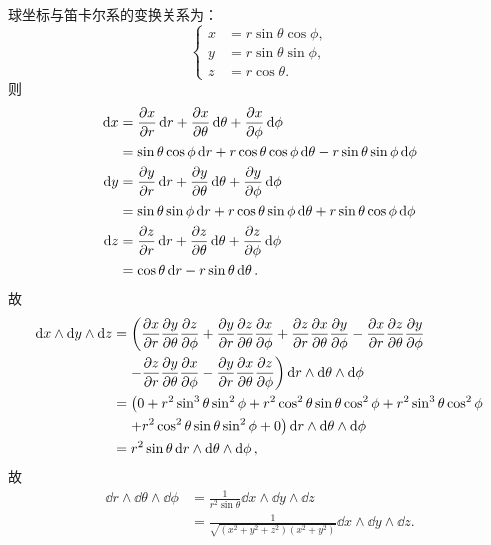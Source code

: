 \begin{xiti}
	\begin{jie}
		球坐标与笛卡尔系的变换关系为：
		\begin{displaymath}
		\left\{
		\begin{aligned}
		x&=r\sin \theta \cos \phi,\\
		y&=r\sin \theta \sin \phi,\\
		z&=r\cos \theta.
		\end{aligned}
		\right.
		\end{displaymath}
		则
		\begin{align*}
		\dd{x} &= \pdv{x}{r} \dd{r} + \pdv{x}{\theta} \dd{\theta} + \pdv{x}{\phi} \dd{\phi}\\
		&= \sin\theta \cos\phi \dd{r} + r \cos\theta \cos\phi \dd{\theta} - r \sin\theta \sin \phi \dd{\phi}\\
		\dd{y} &= \pdv{y}{r} \dd{r} + \pdv{y}{\theta} \dd{\theta} + \pdv{y}{\phi} \dd{\phi}\\
		&= \sin \theta \sin\phi \dd{r} + r \cos\theta \sin \phi \dd{\theta} + r \sin\theta \cos\phi \dd{\phi}\\
		\dd{z} &= \pdv{z}{r} \dd{r} + \pdv{z}{\theta} \dd{\theta} + \pdv{z}{\phi} \dd{\phi}\\
		&= \cos\theta \dd{r} - r\sin\theta \dd{\theta}.
		\end{align*}
		故
		\begin{align*}
		\dd{x} \wedge \dd{y} \wedge \dd{z} =&\mspace{2mu} \left( \pdv{x}{r} \pdv{y}{\theta} \pdv{z}{\phi} + \pdv{y}{r} \pdv{z}{\theta} \pdv{x}{\phi} + \pdv{z}{r} \pdv{x}{\theta} \pdv{y}{\phi} -\pdv{x}{r} \pdv{z}{\theta} \pdv{y}{\phi} \right. \\
		&\left. -\pdv{z}{r} \pdv{y}{\theta} \pdv{x}{\phi} - \pdv{y}{r} \pdv{x}{\theta} \pdv{z}{\phi} \right) \dd{r} \wedge \dd{\theta} \wedge \dd{\phi}\\
		=& \mspace{2mu} \left( 0 + r^2 \sin^3 \theta \sin^2 \phi + r^2 \cos^2 \theta \sin \theta \cos^2 \phi + r^2 \sin^3 \theta \cos^2 \phi  \right. \\
		&\left. + r^2 \cos^2 \theta \sin \theta \sin^2 \phi + 0 \right) \dd{r} \wedge \dd{\theta} \wedge \dd{\phi} \\
		=&\; r^2 \sin \theta \dd{r} \wedge \dd{\theta} \wedge \dd{\phi},
		\end{align*}
		故
		\begin{align*}
		\dd{r} \wedge \dd{\theta} \wedge \dd{\phi} &= \frac{1}{r^2 \sin\theta} \dd{x} \wedge \dd{y} \wedge \dd{z}\\
		&= \frac{1}{\sqrt{\left(x^2+y^2+z^2\right) \left(x^2+y^2\right)}} \dd{x} \wedge \dd{y} \wedge \dd{z}.
		\end{align*}
	\end{jie}
	

\end{xiti}
